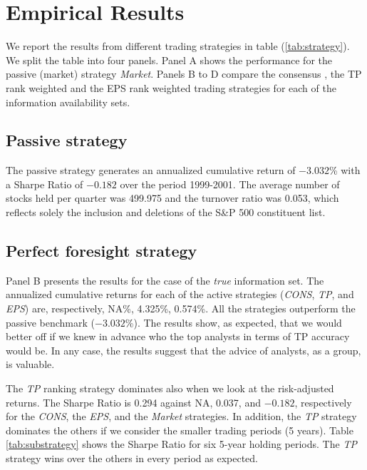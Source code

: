 \documentclass{article}\usepackage[]{graphicx}\usepackage[]{color}
\newcommand{\tr}{\textit{true}}
\begin{document}

\section{Empirical Results}
\label{sec:results}

We report the results from different trading strategies in table (\ref{tab:strategy}). We split the table into four panels. Panel A shows  the performance for  the passive (market) strategy \textit{Market}. Panels B to D compare the consensus , the TP rank weighted and the EPS rank weighted trading strategies for each of the information availability sets. 


\subsection{Passive strategy}

The passive strategy generates an annualized cumulative return of \ensuremath{-3.032}\% with a Sharpe Ratio  of \ensuremath{-0.182} over the period 1999-2001. The average number of stocks held per quarter was 499.975 and the turnover ratio was 0.053, which reflects solely the inclusion and deletions  of the S\&P 500 constituent list.

\subsection{Perfect foresight strategy}
\label{sec:perfect}
Panel B presents the results for the case of the \tr{} information set. The annualized cumulative returns for each of the active strategies (\textit{CONS}, \textit{TP}, and \textit{EPS}) are, respectively, NA\%, 4.325\%, 0.574\%. All the strategies outperform the passive benchmark (\ensuremath{-3.032}\%). The results show, as expected, that  we would better off if we knew in advance who the top analysts in terms of TP accuracy would be. In any case, the results suggest that the advice of analysts, as a group, is valuable. 


The \textit{TP} ranking strategy dominates also when we look at the risk-adjusted returns. The Sharpe Ratio is 0.294 against NA, 0.037, and \ensuremath{-0.182}, respectively for the \textit{CONS}, the \textit{EPS}, and the \textit{Market} strategies. In addition, the \textit{TP} strategy dominates  the others if we consider the smaller trading periods (5 years). Table \ref{tab:substrategy} shows the Sharpe Ratio for six 5-year holding periods. The \textit{TP} strategy wins over the others in every period as expected.
\end{document}
